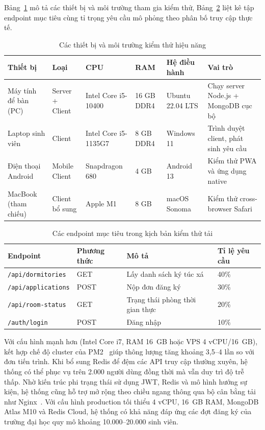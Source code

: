\documentclass[../DoAn.tex]{subfiles}
\begin{document}
Bảng~\ref{tab:test-devices} mô tả các thiết bị và môi trường tham gia kiểm thử,
Bảng~\ref{tab:test-endpoints} liệt kê tập endpoint mục tiêu cùng tỉ trọng yêu cầu
mô phỏng theo phân bố truy cập thực tế.

\begin{table}[H]
\centering
\caption{Các thiết bị và môi trường kiểm thử hiệu năng}
\label{tab:test-devices}
\footnotesize
\begin{tabular}{|p{2.5cm}|p{1.8cm}|p{2.8cm}|p{1.3cm}|p{2.0cm}|p{3.0cm}|}
\hline
\textbf{Thiết bị} & \textbf{Loại} & \textbf{CPU} & \textbf{RAM} & \textbf{Hệ điều hành} & \textbf{Vai trò} \\
\hline
Máy tính để bàn (PC) & Server + Client & Intel Core i5-10400 & 16 GB DDR4 & Ubuntu 22.04 LTS & Chạy server Node.js + MongoDB cục bộ \\
\hline
Laptop sinh viên & Client & Intel Core i5-1135G7 & 8 GB DDR4 & Windows 11 & Trình duyệt client, phát sinh yêu cầu \\
\hline
Điện thoại Android & Mobile Client & Snapdragon 680 & 4 GB & Android 13 & Kiểm thử PWA và ứng dụng native \\
\hline
MacBook (tham chiếu) & Client bổ sung & Apple M1 & 8 GB & macOS Sonoma & Kiểm thử cross-browser Safari \\
\hline
\end{tabular}
\end{table}

\begin{table}[H]
\centering
\caption{Các endpoint mục tiêu trong kịch bản kiểm thử tải}
\label{tab:test-endpoints}
\footnotesize
\begin{tabular}{|p{4.0cm}|p{2.0cm}|p{5.0cm}|p{2.0cm}|}
\hline
\textbf{Endpoint} & \textbf{Phương thức} & \textbf{Mô tả} & \textbf{Tỉ lệ yêu cầu} \\
\hline
\texttt{/api/dormitories} & GET & Lấy danh sách ký túc xá & 40\% \\
\hline
\texttt{/api/applications} & POST & Nộp đơn đăng ký & 30\% \\
\hline
\texttt{/api/room-status} & GET & Trạng thái phòng thời gian thực & 20\% \\
\hline
\texttt{/auth/login} & POST & Đăng nhập & 10\% \\
\hline
\end{tabular}
\end{table}


Với cấu hình mạnh hơn (Intel Core i7, RAM 16~GB hoặc VPS 4 vCPU/16~GB), kết hợp chế độ cluster của PM2~\cite{pm2_docs} giúp thông lượng tăng khoảng 3,5--4 lần so với đơn tiến trình. Khi bổ sung Redis để đệm các API truy cập thường xuyên, hệ thống có thể phục vụ trên 2.000 người dùng đồng thời mà vẫn duy trì độ trễ thấp. Nhờ kiến trúc phi trạng thái sử dụng JWT, Redis và mô hình hướng sự kiện, hệ thống cũng hỗ trợ mở rộng theo chiều ngang thông qua bộ cân bằng tải như Nginx~\cite{nginx_docs}. Với cấu hình production tối thiểu 4 vCPU, 16~GB RAM, MongoDB Atlas M10 và Redis Cloud, hệ thống có khả năng đáp ứng các đợt đăng ký của trường đại học quy mô khoảng 10.000--20.000 sinh viên.
\end{document}
